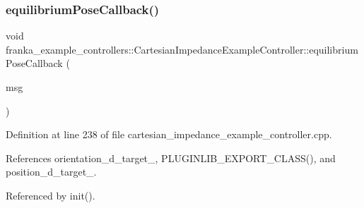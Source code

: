 \subsubsection{\texorpdfstring{equilibrium\+Pose\+Callback()}{equilibriumPoseCallback()}}
{\footnotesize\ttfamily void franka\+\_\+example\+\_\+controllers\+::\+Cartesian\+Impedance\+Example\+Controller\+::equilibrium\+Pose\+Callback (\begin{DoxyParamCaption}\item[{const geometry\+\_\+msgs\+::\+Pose\+Stamped\+Const\+Ptr \&}]{msg }\end{DoxyParamCaption})\hspace{0.3cm}{\ttfamily [private]}}



Definition at line 238 of file cartesian\+\_\+impedance\+\_\+example\+\_\+controller.\+cpp.



References orientation\+\_\+d\+\_\+target\+\_\+, P\+L\+U\+G\+I\+N\+L\+I\+B\+\_\+\+E\+X\+P\+O\+R\+T\+\_\+\+C\+L\+A\+S\+S(), and position\+\_\+d\+\_\+target\+\_\+.



Referenced by init().


